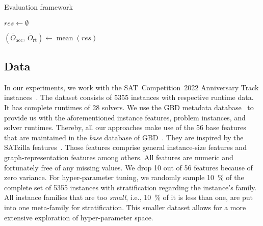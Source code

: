 \documentclass[runningheads]{llncs}
\begin{document}
\vspace{-0.2cm}
\begin{algorithm}[htbp]
  \caption{Evaluation framework}
  \label{alg:eval}


  $res \leftarrow \emptyset$


  $\left( \bar{O}_{\operatorname{acc}},\, \bar{O}_{\operatorname{rt}} \right) \leftarrow \operatorname{mean}\!\left( res \right)$

\end{algorithm}
\vspace{-0.2cm}

\subsection{Data}
In our experiments, we work with the SAT~Competition~2022 Anniversary Track instances~\cite{sat2022}.
The dataset consists of 5355 instances with respective runtime data.
It has complete runtimes of 28 solvers.
We use the GBD metadata database~\cite{IserS18} to provide us with the aforementioned instance features, problem instances, and solver runtimes.
Thereby, all our approaches make use of the 56 base features that are maintained in the \textit{base} database of GBD~\cite{IserS18}.
They are inspired by the SATzilla features~\cite{features}.
Those features comprise general instance-size features and graph-representation features among others.
All features are numeric and fortunately free of any missing values.
We drop 10 out of 56 features because of zero variance.
For hyper-parameter tuning, we randomly sample \SI{10}{\%} of the complete set of 5355 instances with stratification regarding the instance's family.
All instance families that are too \textit{small}, i.e., \SI{10}{\%} of it is less than one, are put into one meta-family for stratification.
This smaller dataset allows for a more extensive exploration of hyper-parameter space.
\end{document}
